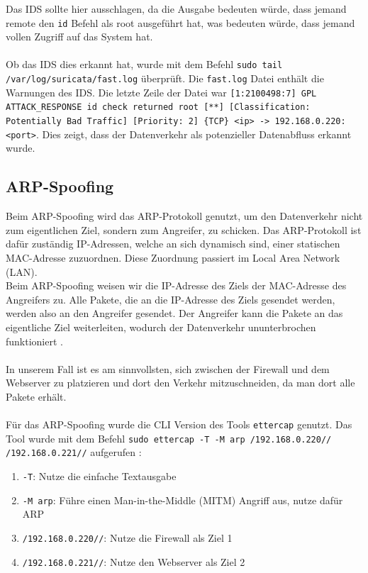 \documentclass[
    a4paper,
    pagesize,
	pdftex,
    12pt,
]{scrartcl}
\begin{document}
Das IDS sollte hier ausschlagen, da die Ausgabe bedeuten würde, dass jemand remote den \lstinline[breaklines]|id| Befehl als root ausgeführt hat, was bedeuten würde, dass jemand vollen Zugriff auf das System hat. \\ \\
Ob das IDS dies erkannt hat, wurde mit dem Befehl
\lstinline[breaklines]|sudo tail /var/log/suricata/fast.log| 
überprüft. Die \lstinline[breaklines]|fast.log| Datei enthält die Warnungen des IDS. 
Die letzte Zeile der Datei war \lstinline[breaklines]|[1:2100498:7] GPL ATTACK_RESPONSE id check returned root [**] [Classification: Potentially Bad Traffic] [Priority: 2] {TCP} <ip> -> 192.168.0.220:<port>|. Dies zeigt, dass der Datenverkehr als potenzieller Datenabfluss erkannt wurde.

\subsection{ARP-Spoofing}
Beim ARP-Spoofing wird das ARP-Protokoll genutzt, um den Datenverkehr nicht zum eigentlichen Ziel, sondern zum Angreifer, zu schicken. Das ARP-Protokoll ist dafür zuständig IP-Adressen, welche an sich dynamisch sind, einer statischen MAC-Adresse zuzuordnen. Diese Zuordnung passiert im Local Area Network (LAN). \\
Beim ARP-Spoofing weisen wir die IP-Adresse des Ziels der MAC-Adresse des Angreifers zu. Alle Pakete, die an die IP-Adresse des Ziels gesendet werden, werden also an den Angreifer gesendet. Der Angreifer kann die Pakete an das eigentliche Ziel weiterleiten, wodurch der Datenverkehr ununterbrochen funktioniert \cite{what-is-arp-spoofing}. \\ \\
In unserem Fall ist es am sinnvollsten, sich zwischen der Firewall und dem Webserver zu platzieren und dort den Verkehr mitzuschneiden, da man dort alle Pakete erhält. \\ \\
Für das ARP-Spoofing wurde die CLI Version des Tools \lstinline[breaklines]|ettercap| genutzt. Das Tool wurde mit dem Befehl \lstinline[breaklines]|sudo ettercap -T -M arp /192.168.0.220// /192.168.0.221//| aufgerufen \cite{ettercap-manual}:
\begin{enumerate}
	\item \lstinline[breaklines]|-T|: Nutze die einfache Textausgabe
	\item \lstinline[breaklines]|-M arp|: Führe einen Man-in-the-Middle (MITM) Angriff aus, nutze dafür ARP
	\item \lstinline[breaklines]|/192.168.0.220//|: Nutze die Firewall als Ziel 1
	\item \lstinline[breaklines]|/192.168.0.221//|: Nutze den Webserver als Ziel 2
\end{enumerate}
\end{document}
